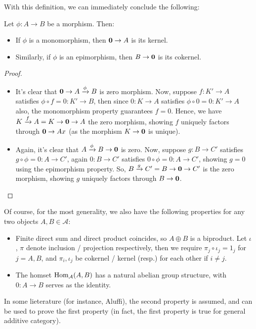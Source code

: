 \documentclass{article}
\begin{document}
With this definition, we can immediately conclude the following:
\begin{prop}
    Let $\phi:A\rightarrow B$ be a morphism. Then:
    \begin{itemize}
        \item[1.] If $\phi$ is a monomorphism, then $\mathbf{0}\rightarrow A$ is its kernel.
        \item[2.] Similarly, if $\phi$ is an epimorphism, then $B\rightarrow \mathbf{0}$ is its cokernel. 
    \end{itemize}
\end{prop}
\begin{proof}

    \hfil

    \begin{itemize}
        \item[1.] It's clear that $\mathbf{0}\rightarrow A\xrightarrow{\phi}B$ is zero morphism. Now, suppose $f:K'\rightarrow A$ satisfies $\phi\circ f=0:K'\rightarrow B$, then since $0:K\rightarrow A$ satisfies $\phi\circ 0=0:K'\rightarrow A$ also, the monomorphism property guarantees $f=0$. Hence, we have $K\xrightarrow{f}A = K\rightarrow \mathbf{0} \rightarrow A$ the zero morphism, showing $f$ uniquely factors through $\mathbf{0}\rightarrow Ax$ (as the morphism $K\rightarrow \mathbf{0}$ is unique).
        
        \hfil

        \item[2.] Again, it's clear that $A\xrightarrow{\phi}B\rightarrow \mathbf{0}$ is zero. Now, suppose $g:B\rightarrow C'$ satisfies $g\circ \phi=0:A\rightarrow C'$, again $0:B\rightarrow C'$ satisfies $0\circ \phi=0:A\rightarrow C'$, showing $g=0$ using the epimorphism property. So, $B\xrightarrow{g}C' = B\rightarrow \mathbf{0} \rightarrow C'$ is the zero morphism, showing $g$ uniquely factors through $B\rightarrow \mathbf{0}$.
    \end{itemize}
\end{proof}

\hfil

Of course, for the most generality, we also have the following properties for any two objects $A,B\in\mathcal{A}$:
\begin{itemize}
    \item Finite direct sum and direct product coincides, so $A\oplus B$ is a biproduct. Let $\iota$, $\pi$ denote inclusion / projection respectively, then we require $\pi_j\circ \iota_j = 1_j$ for $j=A,B$, and $\pi_i,\iota_j$ be cokernel / kernel (resp.) for each other if $i\neq j$.
    \item The homset $\mathrm{Hom}_\mathcal{A}(A,B)$ has a natural abelian group structure, with $0:A\rightarrow B$ serves as the identity.
\end{itemize}
In some lieterature (for instance, Aluffi), the second property is assumed, and can be used to prove the first property (in fact, the first property is true for general additive category). 
\end{document}
